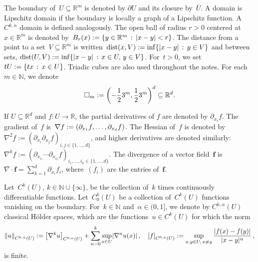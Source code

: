 \documentclass[11pt]{article} %
\let\oldsquare\square %
\renewcommand{\square}{\oldsquare}
\numberwithin{equation}{section}
\theoremstyle{definition}
\let\originalleft\left
\let\originalright\right
\renewcommand{\left}{\mathopen{}\mathclose\bgroup\originalleft}
\renewcommand{\right}{\aftergroup\egroup\originalright}
\newcommand*{\N}{\ensuremath{\mathbb{N}}}
\newcommand*{\R}{\ensuremath{\mathbb{R}}}
\newcommand*{\Rd}{\ensuremath{\mathbb{R}^d}}
\newcommand{\f}{\mathbf{f}}
\newcommand{\cu}{\square}
\DeclareMathOperator{\dist}{dist}
\begin{document}
The boundary of~$U\subseteq \R^m$ is denoted by $\partial U$ and its closure by~$\overline{U}$. A domain is Lipschitz domain if the boundary is locally a graph of a Lipschitz function. A~$C^{k,\alpha}$ domain is defined analogously.  The open ball of radius $r>0$ centered at $x\in\R^m$ is denoted by~$B_r(x):= \left\{ y\in\R^m\,:\, |x-y|<r \right\}$. The distance from a point to a set~$V\subseteq \R^m$ is written~$\dist(x,V):= \inf\left\{ |x-y|\,:\, y\in V\right\}$ and between sets, $\dist(U,V):= \inf\left\{ |x-y|\,:\, x \in U,\, y\in V\right\}$.  For~$t >0$, we set~$t U:= \left\{ t x \,:\, x\in U\right\}$. Triadic cubes are also used throughout the notes. For each~$m\in\N$, we denote 
\begin{equation} 
\label{e.triadiccubes}
\cu_m := \left( -\frac12 3^m, \frac12 3^m \right)^d\subseteq \Rd. 
\end{equation}



If $U\subseteq\Rd$ and $f: U \to \R$, the partial derivatives of $f$ are denoted by $\partial_{x_i} f$. The gradient of~$f$ is~$\nabla f:= \left( \partial_{x_1} f ,\ldots, \partial_{x_d} f \right)$. The Hessian of~$f$ is denoted by~$\nabla^2f:= ( \partial_{x_i} \partial_{x_j} f )_{i,j\in\{1,\ldots,d\}}$, and higher derivatives are denoted similarly:~$\nabla^k f := ( \partial_{x_{i_1}}\cdots\partial_{x_{i_k}} f )_{i_1,\ldots,i_k\in\{1,\ldots,d\}}$. The divergence of a vector field~$\f$ is~$\nabla \cdot \f = \sum_{k=1}^d \partial_{x_i} f_i$, where~$(f_i)$ are the entries of~$\f$. 

\smallskip

Let~$C^k(U)$, $k\in\N\cup\{\infty\}$, be the collection of~$k$ times continuously differentiable functions. Let~$C_0^k(U)$ be a collection of~$C^k(U)$ functions vanishing on the boundary. For~$k\in\N$ and~$\alpha \in (0,1]$, we denote by $C^{k,\alpha}(U)$ classical H\"older spaces, which are the functions~$u\in C^k(U)$ for which the norm 
\begin{equation*} \label{}
\left\| u \right\|_{C^{k,\alpha}(U)} :=
\bigl[\nabla^ku\bigr]_{C^{0,\alpha}(U)}
+
\sum_{n=0}^k \sup_{x\in U} \left| \nabla^n u(x) \right| 
\,,
\quad
\left[ f \right]_{C^{0,\alpha}(U)} 
:=  \sup_{x,y\in U,\,x\neq y} \frac{ \left|  f(x) - f(y) \right|}{|x-y|^\alpha}\,,
\end{equation*}
is finite. 


\smallskip
\end{document}
